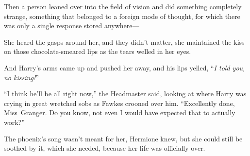 Then a person leaned over into the field of vision and did something completely strange, something that belonged to a foreign mode of thought, for which there was only a single response stored anywhere—

\later

She heard the gasps around her, and they didn’t matter, she maintained the kiss on those chocolate-smeared lips as the tears welled in her eyes.

And Harry’s arms came up and pushed her away, and his lips yelled, “\emph{I told you, no kissing!}”

\later

“I think he’ll be all right now,” the Headmaster said, looking at where Harry was crying in great wretched sobs as Fawkes crooned over him. “Excellently done, Miss~Granger. Do you know, not even I would have expected that to actually work?”

The phoenix’s song wasn’t meant for her, Hermione knew, but she could still be soothed by it, which she needed, because her life was officially over.
